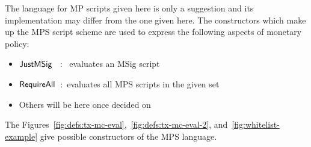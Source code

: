  The language for MP scripts given here is only a suggestion and its
implementation may differ from the one given here. The constructors which make
up the MPS script scheme are used to express the following
aspects of monetary policy:

\begin{itemize}
\item $\mathsf{JustMSig}$~ :~ evaluates an MSig script

\item $\mathsf{RequireAll}$~:~evaluates all MPS scripts in the given set

\item Others will be here once decided on
\end{itemize}

The Figures~\ref{fig:defs:tx-mc-eval},~\ref{fig:defs:tx-mc-eval-2},
and~\ref{fig:whitelist-example} give
possible constructors of the MPS language.


